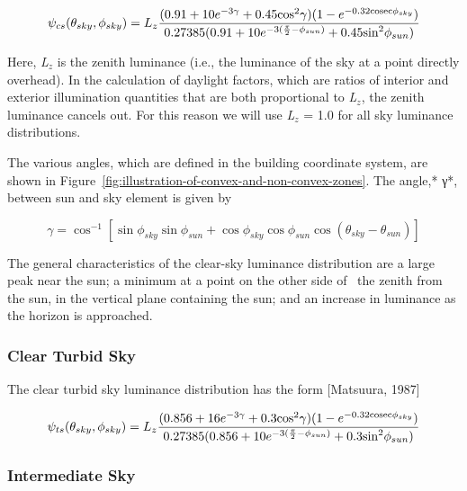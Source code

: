 \begin{equation}
{\psi_{cs}}({\theta_{sky}},{\phi_{sky}}) = {L_z}\frac{{(0.91 + 10{e^{ - 3\gamma }} + 0.45{{\cos }^2}\gamma )(1 - {e^{ - 0.32{\rm{cosec}}{\phi_{sky}}}})}}{{0.27385(0.91 + 10{e^{ - 3(\frac{\pi }{2} - {\phi_{sun}})}} + 0.45{{\sin }^2}{\phi_{sun}})}}
\end{equation}

Here, \emph{L\(_{z}\)} is the zenith luminance (i.e., the luminance of the sky at a point directly overhead). In the calculation of daylight factors, which are ratios of interior and exterior illumination quantities that are both proportional to \emph{L\(_{z}\)}, the zenith luminance cancels out. For this reason we will use \emph{L\(_{z}\)} = 1.0 for all sky luminance distributions.

The various angles, which are defined in the building coordinate system, are shown in Figure~\ref{fig:illustration-of-convex-and-non-convex-zones}. The angle,* γ*, between sun and sky element is given by

\begin{equation}
\gamma  = {\cos ^{ - 1}}\left[ {\sin {\phi_{sky}}\sin {\phi_{sun}} + \cos {\phi_{sky}}\cos {\phi_{sun}}\cos ({\theta_{sky}} - {\theta_{sun}})} \right]
\end{equation}

The general characteristics of the clear-sky luminance distribution are a large peak near the sun; a minimum at a point on the other side of~ the zenith from the sun, in the vertical plane containing the sun; and an increase in luminance as the horizon is approached.

\subsubsection{Clear Turbid Sky}\label{clear-turbid-sky}

The clear turbid sky luminance distribution has the form {[}Matsuura, 1987{]}

\begin{equation}
{\psi_{ts}}({\theta_{sky}},{\phi_{sky}}) = {L_z}\frac{{(0.856 + 16{e^{ - 3\gamma }} + 0.3{{\cos }^2}\gamma )(1 - {e^{ - 0.32{\rm{cosec}}{\phi_{sky}}}})}}{{0.27385(0.856 + 10{e^{ - 3(\frac{\pi }{2} - {\phi_{sun}})}} + 0.3{{\sin }^2}{\phi_{sun}})}}
\end{equation}

\subsubsection{Intermediate Sky}\label{intermediate-sky}

